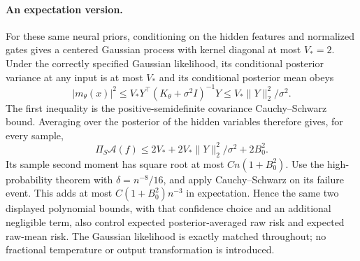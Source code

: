 \paragraph{An expectation version.}
For these same neural priors, conditioning on the hidden features and normalized gates gives a centered Gaussian process with kernel diagonal at most $V_*=2$. Under the correctly specified Gaussian likelihood, its conditional posterior variance at any input is at most $V_*$ and its conditional posterior mean obeys
\[
 |m_\theta(x)|^2\le V_*Y^\top(K_\theta+\sigma^2I)^{-1}Y
                    \le V_*\|Y\|_2^2/\sigma^2.
\]
The first inequality is the positive-semidefinite covariance Cauchy--Schwarz bound. Averaging over the posterior of the hidden variables therefore gives, for every sample,
\[
 \Pi_S\mathcal A(f)\le
        2V_*+2V_*\|Y\|_2^2/\sigma^2+2B_0^2.
\]
Its sample second moment has square root at most $C n(1+B_0^2)$. Use the high-probability theorem with $\delta=n^{-8}/16$, and apply Cauchy--Schwarz on its failure event. This adds at most $C(1+B_0^2)n^{-3}$ in expectation. Hence the same two displayed polynomial bounds, with that confidence choice and an additional negligible term, also control expected posterior-averaged raw risk and expected raw-mean risk. The Gaussian likelihood is exactly matched throughout; no fractional temperature or output transformation is introduced.
